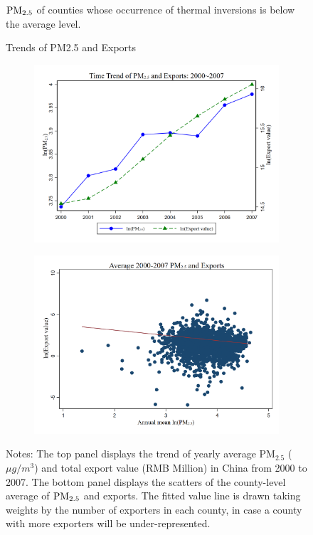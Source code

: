 \documentclass[12pt]{article}
\begin{document}
\begin{figure}[H]
{    $\rm PM_{2.5}$ of counties whose occurrence of thermal inversions is below the average level.}
  \end{figure}

  \newpage
  \centering
  \begin{figure}[H]
    \centering
     \caption{Trends of PM2.5 and Exports}\label{fig:4}
      \begin{subfigure}[b]{.75\textwidth}
       \centering
        \includegraphics[width=\linewidth]{images_updated/exp_pm25_trend}
        \caption{}\label{fig:fig_4a}
        \end{subfigure}
         \begin{subfigure}[b]{.75\textwidth}
         \centering
         \includegraphics[width=\linewidth]{images_updated/exp_pm25}
          \caption{}\label{fig:fig_4b}
          \end{subfigure}
    \small
    \caption*{Notes: The top panel displays the trend of yearly average $\mathrm{PM_{2.5}}$ ($\mu g/m^3$) and total export value (RMB Million) in China from 2000 to 2007. The bottom panel displays the scatters of the county-level average of $\rm PM_{2.5}$ and exports. The  fitted value line is drawn taking weights by the number of exporters in each county, in case a county with more exporters will be under-represented.}
  \end{figure}
  
\end{document}
